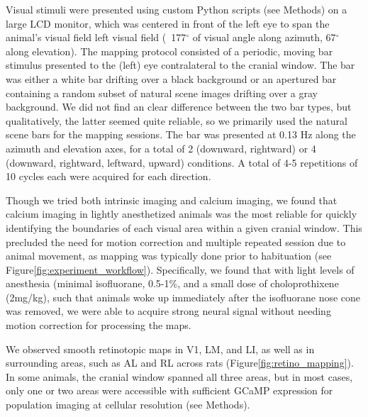 Visual stimuli were presented using custom Python scripts (see Methods) on a large LCD monitor, which was centered in front of the left eye to span the animal's visual field left visual field (~177$^{\circ}$ of visual angle along azimuth, 67$^{\circ}$ along elevation). The mapping protocol consisted of a periodic, moving bar stimulus\cite{Kalatsky2003, Marshel2011} presented to the (left) eye contralateral to the cranial window. The bar was either a white bar drifting over a black background or an apertured bar containing a random subset of natural scene images drifting over a gray background. We did not find an clear difference between the two bar types, but qualitatively, the latter seemed quite reliable, so we primarily used the natural scene bars for the mapping sessions. The bar was presented at 0.13 Hz along the azimuth and elevation axes, for a total of 2 (downward, rightward) or 4 (downward, rightward, leftward, upward) conditions. A total of 4-5 repetitions of 10 cycles each were acquired for each direction. 

Though we tried both intrinsic imaging and calcium imaging, we found that calcium imaging in lightly anesthetized animals was the most reliable for quickly identifying the boundaries of each visual area within a given cranial window. This precluded the need for motion correction and multiple repeated session due to animal movement, as mapping was typically done prior to habituation (see Figure\ref{fig:experiment_workflow}). Specifically, we found that with light levels of anesthesia (minimal isofluorane, 0.5-1\%, and a small dose of choloprothixene (2mg/kg), such that animals woke up immediately after the isofluorane nose cone was removed, we were able to acquire strong neural signal without needing motion correction for processing the maps.

We observed smooth retinotopic maps in  V1, LM, and LI, as well as in surrounding areas, such as AL and RL across rats (Figure\ref{fig:retino_mapping}). In some animals, the cranial window spanned all three areas, but in most cases, only one or two areas were accessible with sufficient GCaMP expression for population imaging at cellular resolution (see Methods).

